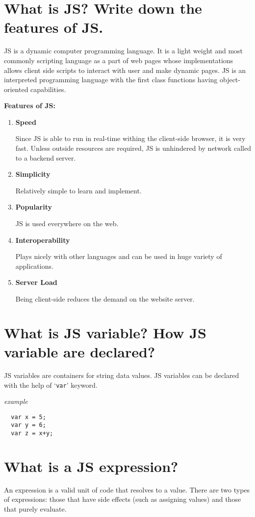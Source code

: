 \section{What is JS?  Write down the features of JS.}
JS is a dynamic computer programming language. It is a light weight and most commonly scripting language as a part of web pages whose implementations allows client side scripts to interact with user and make dynamic pages. JS is an interpreted programming language with the first
class functions having object-oriented capabilities.

\textbf{Features of JS:}
\begin{enumerate}
  \item \textbf{Speed}

    Since JS is able to run in real-time withing the client-side browser, it is very fast. Unless outside resources are required, JS is unhindered by network called to a backend server.
  \item \textbf{Simplicity}

    Relatively simple to learn and implement.
  \item \textbf{Popularity}

    JS is used everywhere on the web.
  \item \textbf{Interoperability}

    Plays nicely with other languages and can be used in huge variety of applications.
  \item \textbf{Server Load}

    Being client-side reduces the demand on the website server.
\end{enumerate}
\section{What is JS variable? How JS variable are declared?}
JS variables are containers for string data values. JS variables can be declared with the help of `\texttt{var}' keyword.

\textit{example}
\begin{verbatim}
  var x = 5;
  var y = 6;
  var z = x+y;
\end{verbatim}
\section{What is a JS  expression?}
An expression is a valid unit of code that resolves to a value. There are two types of expressions: those that have side effects (such as assigning values) and those that purely evaluate.
